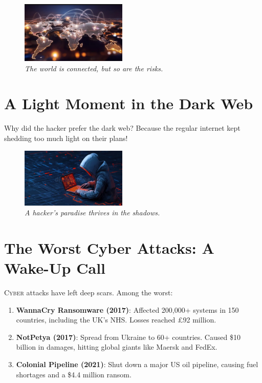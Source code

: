 \begin{figure}[h]
  \centering
  \includegraphics[width=0.45\textwidth]{world.png}
  \caption{\textit{The world is connected, but so are the risks.}}
\end{figure}

\section*{A Light Moment in the Dark Web}
Why did the hacker prefer the dark web? Because the regular internet kept shedding too much light on their plans!

\begin{figure}[h]
  \centering
  \includegraphics[width=0.45\textwidth]{hacker.png}
  \caption{\textit{A hacker's paradise thrives in the shadows.}}
\end{figure}

\section*{The Worst Cyber Attacks: A Wake-Up Call}
\lettrine[lines=2]{C}{yber} attacks have left deep scars. Among the worst:

\begin{enumerate}[label=\arabic*.]
  \item \textbf{WannaCry Ransomware (2017)}: Affected 200,000+ systems in 150 countries, including the UK’s NHS. Losses reached £92 million.
  \item \textbf{NotPetya (2017)}: Spread from Ukraine to 60+ countries. Caused \$10 billion in damages, hitting global giants like Maersk and FedEx.
  \item \textbf{Colonial Pipeline (2021)}: Shut down a major US oil pipeline, causing fuel shortages and a \$4.4 million ransom.
\end{enumerate}

